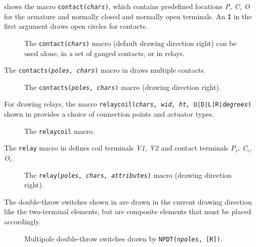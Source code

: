 \pagebreak
{} shows the macro {\tt contact({\sl chars})},
which contains predefined locations {\sl P, C, O}
for the armature and normally closed and normally
open terminals.
An {\tt I} in the first argument draws open circles for contacts.
\begin{figure}[H]
   \vspace*{-\baselineskip}
   
   \caption{The {\tt contact({\sl chars})}
     macro (default drawing direction right)
     can be used alone, in a set of ganged contacts, or in relays.}%
   \label{Contact}
   \end{figure}

The {\tt contacts({\sl poles, chars})} macro in 
draws multiple contacts.
\begin{figure}[H]
   
   \caption{The {\tt contacts({\sl poles, chars})}
     macro (drawing direction right).}
   \label{Contacts}
   \end{figure}

For drawing relays, the macro
 {\tt relaycoil({\sl chars, wid, ht,} {\tt U|D|L|R|}{\sl degrees})}
shown in  provides a choice of connection points and
actuator types. 
\begin{figure}[H]
   
   \vspace{-1ex}
   \caption{The {\tt relaycoil} macro.}
   \label{relaycoil}
   \end{figure}

\pagebreak
The {\tt relay} macro in 
defines coil terminals {\sl V1, V2} and contact
terminals {\sl P$_i$, C$_i$, O$_i$.}
\begin{figure}[H]
   
   \vspace{-1ex}
   \caption{The {\tt relay({\sl poles, chars, attributes})}
     macro (drawing direction right).}
   \label{Relay}
   \end{figure}

The double-throw switches shown in  are drawn in the
current drawing direction like the two-terminal elements, but are
composite elements that must be placed accordingly.
\begin{figure}[H]
   
   \caption{Multipole double-throw switches drawn by
    {\tt NPDT({\sl npoles}, [R])}.}
   \label{NPDT}
   \end{figure}

